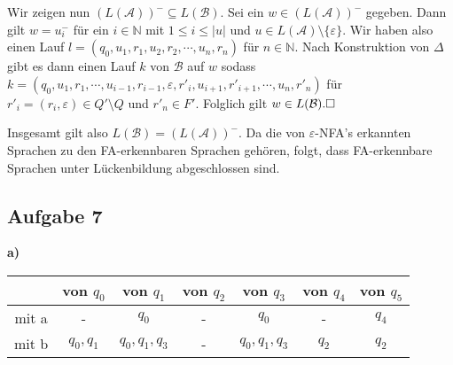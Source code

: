 \documentclass[a4paper,graphics,11pt]{article}
\newcommand{\aufgabe}[1]{\subsection*{Aufgabe #1}}
\begin{document}
Wir zeigen nun $(L(\mathcal{A}))^- \subseteq L(\mathcal{B})$.
Sei ein $w \in (L(\mathcal{A}))^-$ gegeben. Dann gilt $w = u_i^-$ für ein $i \in \mathbb{N}$
mit $1 \leq i \leq |u|$ und $u \in L(\mathcal{A})\setminus \{\varepsilon\}$.
Wir haben also einen Lauf $l = (q_0, u_1, r_1, u_2, r_2, \cdots, u_n, r_n)$
für $n \in \mathbb{N}$.
Nach Konstruktion von $\Delta$ gibt es dann einen Lauf $k$ von $\mathcal{B}$ auf $w$ sodass\\
$k = (q_0, u_1, r_1, \cdots, u_{i-1}, r_{i-1}, \varepsilon, r'_i, u_{i+1}, r'_{i+1}, \cdots,
u_n, r'_n)$ für $r'_i = (r_i, \varepsilon) \in Q' \setminus Q$ und $r'_n \in F'$.
Folglich gilt $w \in L(\mathcal{B}).\hfill\square$

Insgesamt gilt also $L(\mathcal{B}) = (L(\mathcal{A}))^-$. Da die von $\varepsilon$-NFA's
erkannten Sprachen zu den FA-erkennbaren Sprachen gehören, folgt, dass FA-erkennbare
Sprachen unter Lückenbildung abgeschlossen sind.

\aufgabe{7}
\textbf{a)}
\begin{center}
    \begin{tabular}{ c | c | c | c | c | c | c}
        & von $q_0$ & von $q_1$ & von $q_2$ & von $q_3$ & von $q_4$ & von $q_5$\\
        \hline
        mit a & -           & $q_0$             & - & $q_0$             & - & $q_4$ \\ \hline
        mit b & $q_0, q_1$  & $q_0, q_1, q_3$   & - & $q_0, q_1, q_3$   & $q_2$ & $q_2$\\
    \end{tabular}
\end{center}

\newpage
\end{document}
